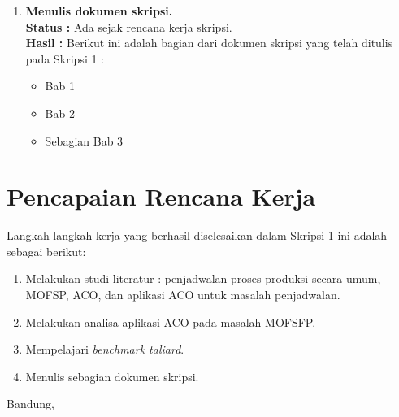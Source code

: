 \documentclass[a4paper,twoside]{article}
\begin{document}
\begin{enumerate}
		\item \textbf{Menulis dokumen skripsi.}\\
		{\bf Status :} Ada sejak rencana kerja skripsi.\\
		{\bf Hasil :} Berikut ini adalah bagian dari dokumen skripsi yang telah ditulis pada Skripsi 1 : 
		\begin{itemize}
		\item Bab 1
		\item Bab 2
		\item Sebagian Bab 3
		\end{itemize}

	
		

	\end{enumerate}

\section{Pencapaian Rencana Kerja}
Langkah-langkah kerja yang berhasil diselesaikan dalam Skripsi 1 ini adalah sebagai berikut:
\begin{enumerate}
\item Melakukan studi literatur : penjadwalan proses produksi secara umum, MOFSP, ACO, dan aplikasi ACO untuk masalah penjadwalan.
\item Melakukan analisa aplikasi ACO pada masalah MOFSFP.
\item Mempelajari {\it benchmark taliard}.
\item Menulis sebagian dokumen skripsi.
\end{enumerate}




\newpage
\vspace{1cm}
\centering Bandung, \tanggal\\
\vspace{2cm} \nama \\ 
\vspace{1cm}
\end{document}
